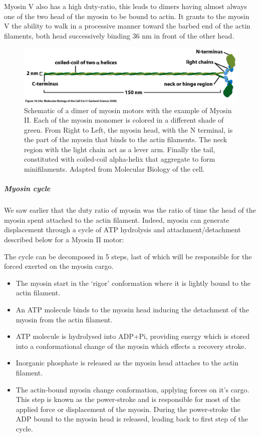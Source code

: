 \documentclass[A4paperpaper,11pt,english]{sphinxmanual}
\begin{document}
Myosin V also has a high duty-ratio, this leads to dimers having almost always
one of the two head of the myosin to be bound to actin. It grants to the myosin
V the ability to walk in a processive manner toward the barbed end of
the actin filaments, both head successively binding 36 nm in front of the other
head.
\begin{figure}[htbp]
\centering
\capstart

\includegraphics[width=0.700\linewidth]{figure-16-54a.jpg}
\caption{Schematic of a dimer of myosin motors with the example of Myosin II.
Each of the myosin monomer is colored in a
different shade of green. From Right to Left, the myosin head, with the N
terminal, is the part of the myosin that binds to the actin filaments. The
neck region with the light chain act as a lever arm. Finally the tail,
constituted with coiled-coil alpha-helix that aggregate to form minifilaments.
Adapted from Molecular Biology of the cell.}\label{parts/part1:fig-myosin}\end{figure}


\subparagraph{Myosin cycle}
\label{parts/part1:myosin-cycle}
We saw earlier that the duty ratio of myosin was the ratio of time the head of
the myosin spent attached to the actin filament. Indeed, myosin can generate
displacement through a cycle of ATP hydrolysis and attachment/detachment
described below for a Myosin II motor:

The cycle can be decomposed in 5 steps, last of which will be responsible for
the forced exerted on the myosin cargo.
\begin{itemize}
\item {} 
The myosin start in the `rigor' conformation where it is lightly bound to
the actin filament.

\item {} 
An ATP molecule binds to the myosin head inducing the detachment of the
myosin from the actin filament.

\item {} 
ATP molecule is hydrolysed into ADP+Pi, providing energy which is stored
into a conformational change of the myosin which effects a recovery
stroke.

\item {} 
Inorganic phosphate is released as the myosin head attaches to the actin
filament.

\item {} 
The actin-bound myosin change conformation, applying forces on it's
cargo. This step is known as the power-stroke and is responsible for most
of the applied force or displacement of the myosin. During the
power-stroke the ADP bound to the myosin head is released, leading back
to first step of the cycle.

\end{itemize}
\end{document}
